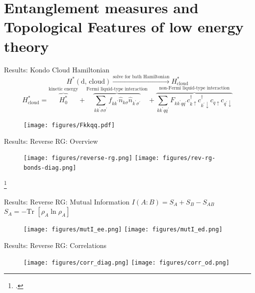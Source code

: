 \documentclass[aspectratio=169]{beamer}
\begin{document}
\section{Entanglement measures and Topological Features of low energy theory}
\begin{frame}[noframenumbering]{Results: Kondo Cloud Hamiltonian}
	\vspace*{-10pt}
	\[H^*(\text{d, cloud}) \xrightarrow{\text{solve for bath Hamiltonian}} H^*_\text{cloud}\] 
	\[H^*_\text{cloud} = \overbrace{H^*_0}^\text{kinetic energy} + \overbrace{\sum_{kk^\prime\sigma\sigma^\prime}f_{kk^\prime}\hat n_{k\sigma}\hat n_{k^\prime\sigma^\prime}}^\text{Fermi liquid-type interaction} + \overbrace{\sum_{kk^\prime qq^\prime}F_{kk^\prime qq^\prime}c^\dagger_{k \uparrow}c^\dagger_{k^\prime \downarrow} c_{q \uparrow}c_{q^\prime \downarrow}}^\text{non-Fermi liquid-type interaction}\]
\begin{figure}[htpb]
	\centering
	\texttt{[image: figures/Fkkqq.pdf]}
\end{figure}
\end{frame}

\begin{frame}[noframenumbering]{Results: Reverse RG: Overview}
	\vspace*{\fill}
	\begin{figure}[htpb]
		\centering
		\texttt{[image: figures/reverse-rg.png]}
		\hspace*{\fill}
		\texttt{[image: figures/rev-rg-bonds-diag.png]}
	\end{figure}
	\vspace*{\fill}
\footcite{am_thesis}
\end{frame}

\begin{frame}[noframenumbering]{Results: Reverse RG: Mutual Information}
	\hspace*{\fill}	\(I(A:B) = S_A + S_B - S_{AB}\)\hspace*{\fill}\(S_A = -\text{Tr }\left[\rho_A \ln \rho_A\right]\)\hspace*{\fill}
	\begin{figure}[htpb]
		\centering
		\texttt{[image: figures/mutI\_ee.png]}\hspace*{\fill}
		\texttt{[image: figures/mutI\_ed.png]}
	\end{figure}
\end{frame}


\begin{frame}[noframenumbering]{Results: Reverse RG: Correlations}
	\begin{figure}[htpb]
		\centering
		\texttt{[image: figures/corr\_diag.png]}\hspace*{\fill}
		\texttt{[image: figures/corr\_od.png]}
	\end{figure}
\end{frame}
\end{document}
